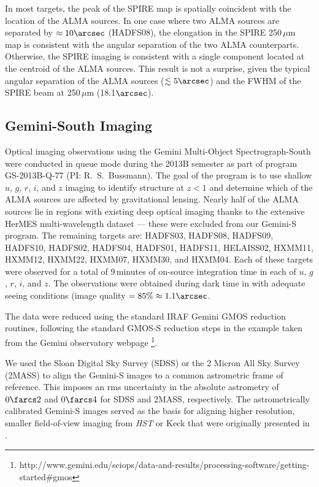 \documentclass[iop]{emulateapj}
\begin{document}
In most targets, the peak of the SPIRE map is spatially coincident with the
location of the ALMA sources.  In one case where two ALMA sources are separated
by $\approx 10\arcsec$ (HADFS08), the elongation in the SPIRE 250$\,\mu$m map is
consistent with the angular separation of the two ALMA counterparts.
Otherwise, the SPIRE imaging is consistent with a single component located at
the centroid of the ALMA sources.  This result is not a surprise, given the
typical angular separation of the ALMA sources ($\lesssim 5\arcsec$) and the
FWHM of the SPIRE beam at 250$\,\mu$m (18.1$\arcsec$). 

\subsection{Gemini-South Imaging}\label{sec:geminiobs}

Optical imaging observations using the Gemini Multi-Object Spectrograph-South
\citep[GMOS-S;][]{Hook:2004qy} were conducted in queue mode during the 2013B
semester as part of program GS-2013B-Q-77 (PI: R.~S.~Bussmann).  The goal of the
program is to use shallow $u$, $g$, $r$, $i$, and $z$ imaging to identify
structure at $z<1$ and determine which of the ALMA sources are affected by
gravitational lensing.  Nearly half of the ALMA sources lie in regions with
existing deep optical imaging thanks to the extensive HerMES multi-wavelength
dataset --- these were excluded from our Gemini-S program.  The remaining
targets are: HADFS03, HADFS08, HADFS09, HADFS10, HADFS02, HADFS04, HADFS01, HADFS11,
HELAISS02, HXMM11, HXMM12, HXMM22, HXMM07, HXMM30, and HXMM04.  Each of these
targets were observed for a total of 9$\,$minutes of on-source integration time
in each of $u$, $g$, $r$, $i$, and $z$.  The observations were obtained during
dark time in with adequate seeing conditions (image quality $ = 85\% \approx
1.1\arcsec$.

The data were reduced using the standard {\sc IRAF} Gemini GMOS reduction
routines, following the standard GMOS-S reduction steps in the example taken
from the Gemini observatory webpage
\footnote{http://www.gemini.edu/sciops/data-and-results/processing-software/getting-started\#gmos}.

We used the Sloan Digital Sky Survey (SDSS) or the 2 Micron All Sky Survey
(2MASS) to align the Gemini-S images to a common astrometric frame of
reference.  This imposes an rms uncertainty in the absolute astrometry of
$0\farcs2$ and $0\farcs4$ for SDSS and 2MASS, respectively.  The
astrometrically calibrated Gemini-S images served as the basis for aligning
higher resolution, smaller field-of-view imaging from {\it HST} or Keck that
were originally presented in \citet{Calanog:2014lr}.
\end{document}
